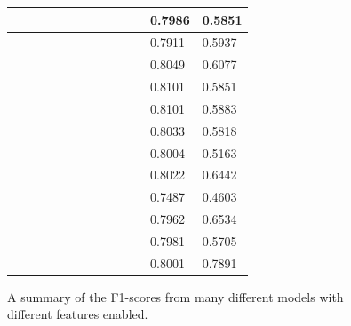 \documentclass[preprint]{style}
\begin{document}
\begin{figure}[ht]
\begin{center}
\begin{tabular}{|l|l|l|l|l|l|l|l|l|l|l||l|l|}
	& \checkmark & \checkmark & \checkmark & \checkmark & \checkmark & \checkmark & \checkmark & \checkmark & \checkmark & \checkmark & 0.7986 & 0.5851	\\ \hline
	\checkmark & & \checkmark & \checkmark & \checkmark & \checkmark & \checkmark & \checkmark & \checkmark & \checkmark & \checkmark & 0.7911 & 0.5937	\\ \hline
	\checkmark & \checkmark & & \checkmark & \checkmark & \checkmark & \checkmark & \checkmark & \checkmark & \checkmark & \checkmark & 0.8049 & 0.6077	\\ \hline
	\checkmark & \checkmark & \checkmark & & \checkmark & \checkmark & \checkmark & \checkmark & \checkmark & \checkmark & \checkmark & 0.8101 & 0.5851	\\ \hline
	\checkmark & \checkmark & \checkmark & \checkmark & & \checkmark & \checkmark & \checkmark & \checkmark & \checkmark & \checkmark & 0.8101 & 0.5883	\\ \hline	
	\checkmark & \checkmark & \checkmark & \checkmark & \checkmark & & \checkmark & \checkmark & \checkmark & \checkmark & \checkmark & 0.8033 & 0.5818	\\ \hline	
	\checkmark & \checkmark & \checkmark & \checkmark & \checkmark & \checkmark & & \checkmark & \checkmark & \checkmark & \checkmark & 0.8004 & 0.5163	\\ \hline	
	\checkmark & \checkmark & \checkmark & \checkmark & \checkmark & \checkmark & \checkmark & & \checkmark & \checkmark & \checkmark & 0.8022 & 0.6442	\\ \hline	
	\checkmark & \checkmark & \checkmark & \checkmark & \checkmark & \checkmark & \checkmark & \checkmark & & \checkmark & \checkmark & 0.7487 & 0.4603	\\ \hline	
	\checkmark & \checkmark & \checkmark & \checkmark & \checkmark & \checkmark & \checkmark & \checkmark & \checkmark & & \checkmark & 0.7962 & 0.6534	\\ \hline	
	\checkmark & \checkmark & \checkmark & \checkmark & \checkmark & \checkmark & \checkmark & \checkmark & \checkmark & \checkmark & & 0.7981 & 0.5705	\\ \hline	
	
	\checkmark & \checkmark & \checkmark & \checkmark & \checkmark & \checkmark & \checkmark & \checkmark & \checkmark & \checkmark & \checkmark & 0.8001 & 0.7891	\\ \hline

\end{tabular}
\end{center}
\caption{A summary of the F1-scores from many different models with different features enabled.}
\label{fig:summary_f1_scores}
\end{figure}
\end{document}
